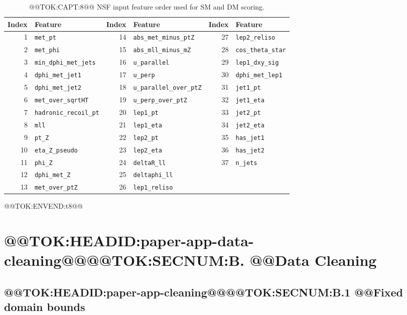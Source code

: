 \documentclass[11pt]{article}
\begin{document}
\begin{table}[t]
\centering
\scriptsize
\caption{@@TOK:CAPT:8@@ NSF input feature order used for SM and DM scoring.}
\label{tab:appendix-nsf-feature-order}
%
\begin{tabular}{rlrlrl}
\toprule
Index & Feature & Index & Feature & Index & Feature \\
\midrule
1 & \texttt{met\_pt} & 14 & \texttt{abs\_met\_minus\_ptZ} & 27 & \texttt{lep2\_reliso} \\
2 & \texttt{met\_phi} & 15 & \texttt{abs\_mll\_minus\_mZ} & 28 & \texttt{cos\_theta\_star} \\
3 & \texttt{min\_dphi\_met\_jets} & 16 & \texttt{u\_parallel} & 29 & \texttt{lep1\_dxy\_sig} \\
4 & \texttt{dphi\_met\_jet1} & 17 & \texttt{u\_perp} & 30 & \texttt{dphi\_met\_lep1} \\
5 & \texttt{dphi\_met\_jet2} & 18 & \texttt{u\_parallel\_over\_ptZ} & 31 & \texttt{jet1\_pt} \\
6 & \texttt{met\_over\_sqrtHT} & 19 & \texttt{u\_perp\_over\_ptZ} & 32 & \texttt{jet1\_eta} \\
7 & \texttt{hadronic\_recoil\_pt} & 20 & \texttt{lep1\_pt} & 33 & \texttt{jet2\_pt} \\
8 & \texttt{mll} & 21 & \texttt{lep1\_eta} & 34 & \texttt{jet2\_eta} \\
9 & \texttt{pt\_Z} & 22 & \texttt{lep2\_pt} & 35 & \texttt{has\_jet1} \\
10 & \texttt{eta\_Z\_pseudo} & 23 & \texttt{lep2\_eta} & 36 & \texttt{has\_jet2} \\
11 & \texttt{phi\_Z} & 24 & \texttt{deltaR\_ll} & 37 & \texttt{n\_jets} \\
12 & \texttt{dphi\_met\_Z} & 25 & \texttt{deltaphi\_ll} & & \\
13 & \texttt{met\_over\_ptZ} & 26 & \texttt{lep1\_reliso} & & \\
\bottomrule
\end{tabular}

@@TOK:ENVEND:t8@@\end{table}


\section{@@TOK:HEADID:paper-app-data-cleaning@@@@TOK:SECNUM:B. @@Data Cleaning}

\subsection{@@TOK:HEADID:paper-app-cleaning@@@@TOK:SECNUM:B.1 @@Fixed domain bounds}
\end{document}
